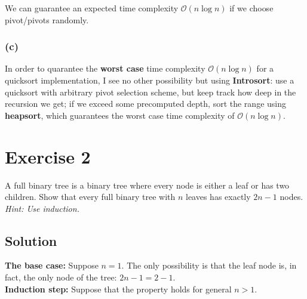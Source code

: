 \documentclass[10pt]{article}
\begin{document}
We can guarantee an expected time complexity $\mathcal{O}(n \log n)$ if we choose pivot/pivots randomly.

\subsubsection*{(c)} In order to quarantee the \textbf{worst case} time complexity $\mathcal{O}(n \log n)$ for a quicksort implementation, I see no other possibility but using \textbf{Introsort}: use a quicksort with arbitrary pivot selection scheme, but keep track how deep in the recursion we get; if we exceed some precomputed depth, sort the range using \textbf{heapsort}, which guarantees the worst case time complexity of $\mathcal{O}(n \log n)$.

\section*{Exercise 2}
\color{blue} A full binary tree is a binary tree where every node is either a leaf or has two children. Show that every full binary tree with $n$ leaves has exactly $2n - 1$ nodes. \textit{Hint: Use induction.}
\color{black}

\subsection*{Solution}
\textbf{The base case:} Suppose $n = 1$. The only possibility is that the leaf node is, in fact, the only node of the tree: $2n - 1 = 2 - 1$. \\
\textbf{Induction step:} Suppose that the property holds for general $n > 1$.
\end{document}
